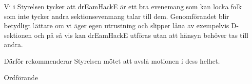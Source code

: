 \documentclass[../_main/handlingar.tex]{subfiles}
\begin{document}
\motionssvar

Vi i Styrelsen tycker att drEamHackE är ett bra evenemang som kan locka folk som inte tycker andra sektionsevenmang talar till dem. Genomförandet blir betydligt lättare om vi äger egen utrustning och slipper låna av exempelvis D-sektionen och på så vis kan drEamHackE utföras utan att hänsyn behöver tas till andra.

Därför rekommenderar Styrelsen mötet att avslå motionen i dess helhet.

\begin{signatures}{1}
    \ist
    \signature{\ordf}{Ordförande}
\end{signatures}
\end{document}
